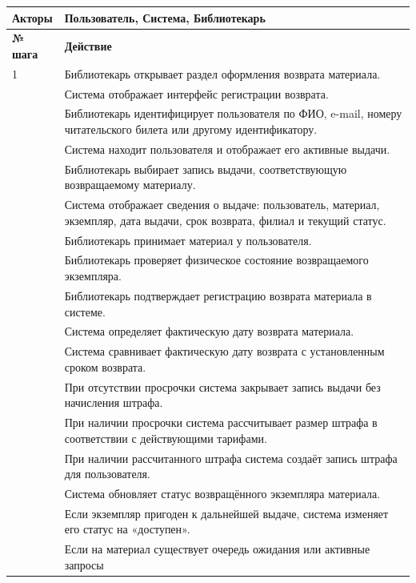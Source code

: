 \documentclass[12pt,a4paper]{article}
\begin{document}
\begin{xltabular}{\textwidth}{
				|>{\raggedright\arraybackslash}p{2.7cm}
				|>{\raggedright\arraybackslash}X|
			}
			\textbf{Акторы} &
			Пользователь, Система, Библиотекарь \\
			\hline
			
			
			\textbf{№ шага} & \textbf{Действие} \\
			\hline
			
			1 & Библиотекарь открывает раздел оформления возврата материала. \\
			 & Система отображает интерфейс регистрации возврата. \\
			 & Библиотекарь идентифицирует пользователя по ФИО, e-mail, номеру
			читательского билета или другому идентификатору. \\
			 & Система находит пользователя и отображает его активные выдачи. \\
			 & Библиотекарь выбирает запись выдачи, соответствующую возвращаемому
			материалу. \\
			 & Система отображает сведения о выдаче: пользователь, материал,
			экземпляр, дата выдачи, срок возврата, филиал и текущий статус. \\
			 & Библиотекарь принимает материал у пользователя. \\
			 & Библиотекарь проверяет физическое состояние возвращаемого
			экземпляра. \\
			 & Библиотекарь подтверждает регистрацию возврата материала в системе. \\
			 & Система определяет фактическую дату возврата материала. \\
			 & Система сравнивает фактическую дату возврата с установленным сроком
			возврата. \\
			 & При отсутствии просрочки система закрывает запись выдачи без
			начисления штрафа. \\
			 & При наличии просрочки система рассчитывает размер штрафа в
			соответствии с действующими тарифами. \\
			 & При наличии рассчитанного штрафа система создаёт запись штрафа для
			пользователя. \\
			 & Система обновляет статус возвращённого экземпляра материала. \\
			 & Если экземпляр пригоден к дальнейшей выдаче, система изменяет его
			статус на «доступен». \\
			 & Если на материал существует очередь ожидания или активные запросы

\end{xltabular}
\end{document}
